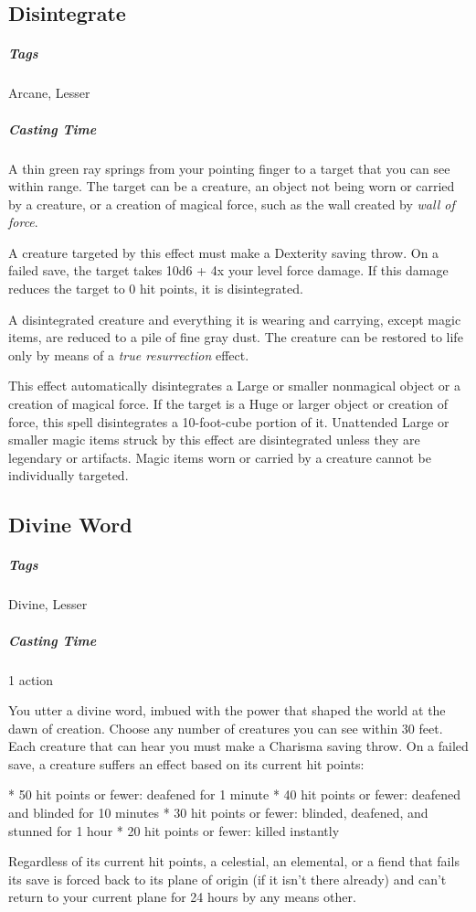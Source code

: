 \subsection{Disintegrate}\label{spell:disintegrate}
\subparagraph*{Tags} Arcane, Lesser
\subparagraph*{Casting Time}

A thin green ray springs from your pointing finger to a target that you can see within range. The target can be a creature, an object not being worn or carried by a creature, or a creation of magical force, such as the wall created by \textit{wall of force}.

A creature targeted by this effect must make a Dexterity saving throw. On a failed save, the target takes 10d6 + 4x your level force damage. If this damage reduces the target to 0 hit points, it is disintegrated.

A disintegrated creature and everything it is wearing and carrying, except magic items, are reduced to a pile of fine gray dust. The creature can be restored to life only by means of a \textit{true resurrection} effect.

This effect automatically disintegrates a Large or smaller nonmagical object or a creation of magical force. If the target is a Huge or larger object or creation of force, this spell disintegrates a 10-foot-cube portion of it. Unattended Large or smaller magic items struck by this effect are disintegrated unless they are legendary or artifacts. Magic items worn or carried by a creature cannot be individually targeted.

\subsection{Divine Word}\label{spell:divine-word}
\subparagraph*{Tags} Divine, Lesser
\subparagraph*{Casting Time} 1 action

You utter a divine word, imbued with the power that shaped the world at the dawn of creation. Choose any number of creatures you can see within 30 feet. Each creature that can hear you must make a Charisma saving throw. On a failed save, a creature suffers an effect based on its current hit points:

* 50 hit points or fewer: deafened for 1 minute
* 40 hit points or fewer: deafened and blinded for 10 minutes
* 30 hit points or fewer: blinded, deafened, and stunned for 1 hour
* 20 hit points or fewer: killed instantly 

Regardless of its current hit points, a celestial, an elemental, or a fiend that fails its save is forced back to its plane of origin (if it isn't there already) and can't return to your current plane for 24 hours by any means other.

